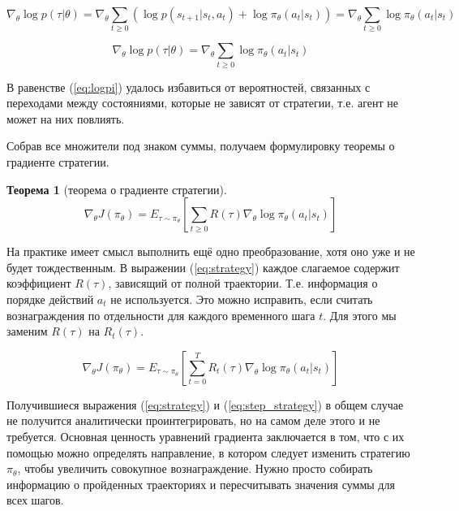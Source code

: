 \documentclass[a4paper,12pt]{article}
\newtheorem{theorem}{Теорема}[section]
\numberwithin{equation}{section}
\begin{document}
\begin{equation*} 
	\nabla_\theta \log p(\tau | \theta) = \nabla_\theta 
\sum_{t \ge 0} \left( \log p(s_{t+1} | s_t, a_t) + \log \pi_\theta(a_t | s_t) \right) = \nabla_\theta \sum_{t \ge 0} \log \pi_\theta (a_t | s_t)
\end{equation*}

\begin{equation} \label{eq:logpi}
	\nabla_\theta \log p(\tau | \theta) = \nabla_\theta \sum_{t \ge 0} \log \pi_\theta (a_t | s_t)
\end{equation}

В равенстве (\ref{eq:logpi}) удалось избавиться от вероятностей, связанных с переходами между состояниями, которые не зависят от стратегии, т.е. агент не может на них повлиять. 

Собрав все множители под знаком суммы, получаем формулировку теоремы о градиенте стратегии. 

\begin{theorem}[теорема о градиенте стратегии]
	\begin{equation} \label{eq:strategy}
	\nabla_\theta J(\pi_{\theta}) = E_{\tau \sim \pi_{\theta}} \left[ \sum_{t \ge 0} R(\tau) \nabla_\theta  \log \pi_\theta (a_t | s_t) \right]
	\end{equation}
\end{theorem}

На практике имеет смысл выполнить ещё одно преобразование, хотя оно уже и не будет тождественным. В выражении (\ref{eq:strategy}) каждое слагаемое содержит коэффициент $R(\tau)$, зависящий от полной траектории. Т.е. информация о порядке действий $a_t$ не используется. Это можно исправить, если считать вознаграждения по отдельности для каждого временного шага $t$. Для этого мы заменим $R(\tau)$ на $R_t(\tau)$.

\begin{equation} \label{eq:step_strategy}
\nabla_\theta J(\pi_{\theta}) = E_{\tau \sim \pi_{\theta}} \left[ \sum_{t = 0}^{T} R_t(\tau) \nabla_\theta  \log \pi_\theta (a_t | s_t) \right]
\end{equation}

Получившиеся выражения (\ref{eq:strategy}) и (\ref{eq:step_strategy}) в общем случае не получится аналитически проинтегрировать, но на самом деле этого и не требуется. Основная ценность уравнений градиента заключается в том, что с их помощью можно определять направление, в котором следует изменить стратегию $\pi_\theta$, чтобы увеличить совокупное вознаграждение. Нужно просто собирать информацию о пройденных траекториях и пересчитывать значения суммы для всех шагов.
\end{document}
